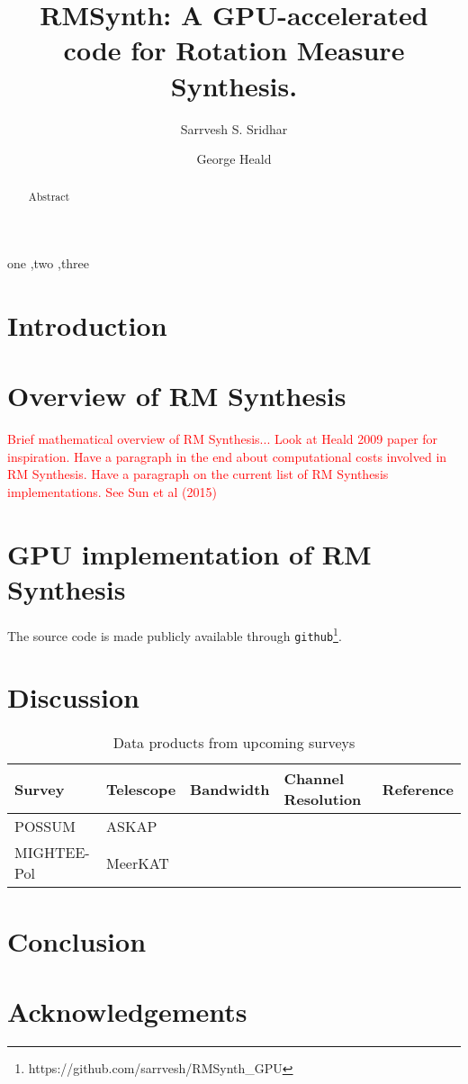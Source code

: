 \documentclass[final,authoryear,3p,times]{elsarticle}
\begin{document}
\begin{frontmatter}

\title{RMSynth: A GPU-accelerated code for Rotation Measure Synthesis.}

\author[kap, ast]{Sarrvesh S. Sridhar}
\author[csi, kap]{George Heald}

\address[kap]{Kapteyn Astronomical Institute, University of Groningen, Postbus 800, 9700AV Groningen, The Netherlands.}
\address[ast]{ASTRON, the Netherlands Institute for Radio Astronomy, Postbus 2, 7990 AA, Dwingeloo, The Netherlands.}
\address[csi]{csiro}

\begin{abstract}
Abstract
\end{abstract}

\begin{keyword}
one \sep  two  \sep three
\end{keyword}

\end{frontmatter}

\section{Introduction}

\section{Overview of RM Synthesis}
\textcolor{red}{Brief mathematical overview of RM Synthesis... Look at Heald 2009 paper for inspiration.}
\textcolor{red}{Have a paragraph in the end about computational costs involved in RM Synthesis.}
\textcolor{red}{Have a paragraph on the current list of RM Synthesis implementations. See Sun et al (2015)}

\section{GPU implementation of RM Synthesis}

The source code is made publicly available through \texttt{github}\footnote{https://github.com/sarrvesh/RMSynth\_GPU}.

\section{Discussion}

\begin{table*}
\caption{Data products from upcoming surveys}
\label{tab:dataProducts}
\centering
\begin{tabular}{lllll}
\hline \hline
Survey  & Telescope & Bandwidth & Channel Resolution & Reference \\
\hline
POSSUM      & ASKAP \\
MIGHTEE-Pol & MeerKAT \\
\hline
\end{tabular}
\end{table*}

\section{Conclusion}

\section*{Acknowledgements}



\end{document}
